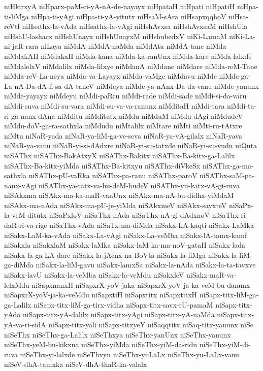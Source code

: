 {niHkirxyA
niHparx-paM-ci-yA-nA-de-nayayx
niHpataH
niHpati
niHpatiH
niHpa-ti-liMga
niHpa-ti-yAgi
niHpa-ti-yA-yitutx
niHsaM-sAra
niHsapxqqhoV
niHsa-reVtf
niHsathx-la-vAda
niHsathx-la-vAgi
niHshAvxsa
niHshAvxsaM
niHshUla
niHshU-lashacx
niHshUnayx
niHshUnayxM
niHshubedxV
niKi-LamaM
niKi-La-ni-jaR-rara
niLaya
niMdA
niMdA-naMda
niMdAta
niMdA-tane
niMda
niMdakAH
niMdakaH
niMda-kana
niMda-ka-ranUnx
niMda-kare
niMda-lalxde
niMdalelxV
niMdalilx
niMda-lilxye
niMdanA
niMdane
niMdare
niMda-reM-Tane
niMda-reV-La-neya
niMda-va-Layayx
niMda-vaMge
niMdavu
niMde
niMde-ga-La-nA-Da-dA-li-sa-dA-taneV
niMdeya
niMde-ya-nAnx-Da-da-vanu
niMde-yanunx
niMde-yayayx
niMdeyu
niMdi-paRru
niMdi-rade
niMdi-sade
niMdi-si-da-varu
niMdi-suva
niMdi-su-vara
niMdi-su-va-va-ranunx
niMditaH
niMdi-tara
niMdi-ta-ri-ga-nanx-dAna
niMditu
niMditutx
niMdu
niMduM
niMdu-dAgi
niMdudeV
niMdu-doV-ga-ra-sathxla
niMdudu
niMtalilx
niMtare
niMti
niMti-ru-tAtxre
niMtu
niNaR-yada
niNaR-ya-liM-ga-ve-seva
niNaR-ya-vA-gilalx
niNaR-yava
niNaR-ya-vanu
niNaR-yi-si-dAdxre
niNaR-yi-su-tatxde
niNaR-yi-su-vudu
niQuta
niSAThx
niSAThx-BakAtxyX
niSAThx-Bakitx
niSAThx-Ba-kitx-ga-Lalilx
niSAThx-Ba-kitx-yiMda
niSAThx-Ba-kitxyu
niSAThx-diVkeSx
niSAThx-ga-ma-sathxla
niSAThx-pU-vaRka
niSAThx-pa-ranu
niSAThx-paroV
niSAThx-saM-pa-nanx-vAgi
niSAThx-ya-tatx-va-hu-deM-budeV
niSAThx-yu-katx-vA-gi-ruva
niSAkxma
niSAkx-ma-ka-maR-vanUnx
niSAkx-ma-nA-bu-didhx-yiMdaM
niSAkx-ma-nAda
niSAkx-ma-pU-je-yiMda
niSAkxmeV
niSAkx-sayxteV
niSaPx-la-veM-ditutx
niSaPxloV
niSaThx-nAda
niSaThx-nA-gi-dAdxnoV
niSaThx-ri-daR-ri-va-rige
niSaThx-vAda
niSaTx-ma-diMda
niSakx-LA-kaqti
niSakx-LaMka
niSakx-LaM-ka-vAda
niSakx-La-vAgi
niSakx-La-veMba
niSakx-lA-tamx-kamf
niSakxla
niSakxlaM
niSakx-laMka
niSakx-laM-ka-ma-noV-gataH
niSakx-lada
niSakx-la-ga-LA-dare
niSakx-la-jAcnx-na-BoVta
niSakx-la-liMga
niSakx-la-liM-ga-diMda
niSakx-la-liM-gavu
niSakx-lamxSa
niSakx-la-nAda
niSakx-la-ta-tavxve
niSakx-lavU
niSakx-la-veMba
niSakx-la-veMdu
niSakxleV
niSakx-maR-va-lelxMdu
niSapxnanxH
niSapxrX-yoV-jaka
niSapxrX-yoV-ja-ka-veM-bu-danunx
niSapxrX-yoV-ja-ka-veMdu
niSapxtiH
niSapxtitx
niSapxtitxH
niSapx-titx-liM-ga-ga-Lalilx
niSapx-titx-liM-ga-tirx-vidha
niSapx-titx-savx-rU-pamaM
niSapx-titx-yAda
niSapx-titx-yA-dalilx
niSapx-titx-yAgi
niSapx-titx-yA-naMda
niSapx-titx-yA-va-ri-sidA
niSapx-titx-yali
niSapx-titxyeY
niSaqqtitx
niSaq-titx-yanunx
niSe
niSeThx
niSeThx-ga-Lalilx
niSeThxya
niSeThx-yanUnx
niSeThx-yanunx
niSeThx-yeM-bu-kikxna
niSeThx-yiMda
niSeThx-yiM-da-ridu
niSeThx-yiM-di-ruva
niSeThx-yi-lalxde
niSeThxyu
niSeThx-yuLaLx
niSeThx-yu-LaLx-vanu
niSeV-dhA-tamxka
niSeV-dhA-thaR-ka-valalx
}
